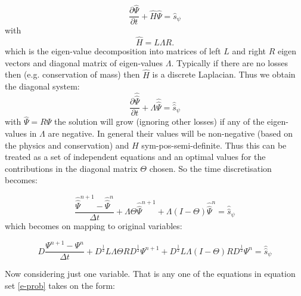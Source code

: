 \begin{equation}
\frac{\partial \hat \Psi}{\partial t} + \hat H \hat \Psi = \hat s_\psi
\label{w-rho-e-prob}
\end{equation} 
with 
\begin{equation}
\hat H
= L \Lambda R. 
\label{stab_matrix}
\end{equation}
which is the eigen-value decomposition into matrices of left $L$ and right $R$ eigen vectors and diagonal matrix of eigen-values $\Lambda$. Typically if there are no losses then (e.g. conservation of mass) then $\hat H$ is a discrete Laplacian. Thus we obtain the diagonal system: 
\begin{equation}
\frac{\partial \hat {\hat \Psi}}{\partial t} + \Lambda \hat{\hat\Psi} = \hat{\hat s}_\psi
\label{e-prob}
\end{equation} 
with $\hat\Psi=R\Psi$ the solution will grow (ignoring other losses) if any of the eigen-values in $\Lambda$ are negative. In general their values will be non-negative (based on the physics and conservation) and $H$ sym-pos-semi-definite.  Thus this can be treated as a set of independent equations and an optimal values for the contributions in the diagonal matrix $\Theta$ chosen. So the time discretisation becomes:


\begin{equation}
\frac{\hat {\hat \Psi}^{n+1}-\hat {\hat \Psi}^{n}}{\Delta t} + \Lambda \Theta\hat{\hat\Psi}^{n+1} +\Lambda(I-\Theta) \hat{\hat\Psi}^n= \hat{\hat s}_\psi
\label{e-prob-time-term-opt-theta}
\end{equation} 
which becomes on mapping to original variables: 

\begin{equation}
D\frac{ { \Psi^{n+1}}- {\Psi^{n}}}{\Delta t} 
+ D^{\frac{1}{2}} L\Lambda \Theta R D^{\frac{1}{2}} {\Psi^{n+1}}
+ D^{\frac{1}{2}} L\Lambda (I-\Theta) R D^{\frac{1}{2}} {\Psi^{n}} 
= \hat{\hat s}_\psi
\label{e-prob-time-term-opt-theta-orig-var}
\end{equation} 

Now considering just one variable. That is any one of 
the equations in equation set \ref{e-prob} takes on the form: 

